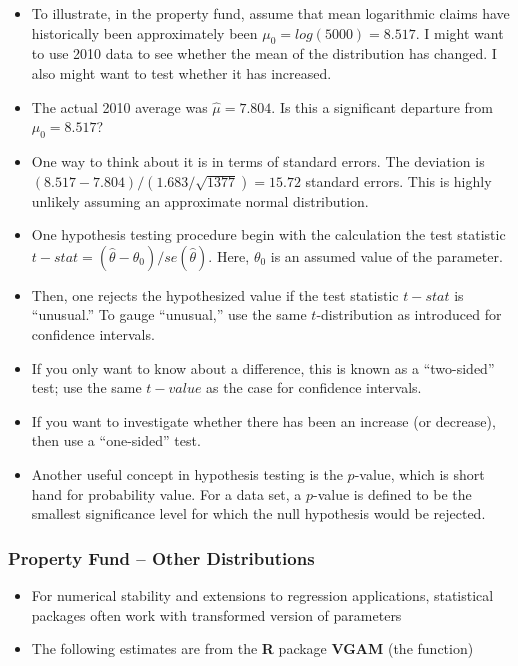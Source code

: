 \documentclass[]{book}
\theoremstyle{definition}
\theoremstyle{definition}
\theoremstyle{definition}
\theoremstyle{remark}
\begin{document}
\begin{itemize}
\item
  To illustrate, in the property fund, assume that mean logarithmic
  claims have historically been approximately been
  \(\mu_0 = log(5000)= 8.517\). I might want to use 2010 data to see
  whether the mean of the distribution has changed. I also might want to
  test whether it has increased.
\item
  The actual 2010 average was \(\hat{\mu} =7.804\). Is this a
  significant departure from \(\mu_0 = 8.517\)?
\item
  One way to think about it is in terms of standard errors. The
  deviation is \((8.517-7.804)/(1.683/\sqrt{1377}) = 15.72\) standard
  errors. This is highly unlikely assuming an approximate normal
  distribution.
\item
  One hypothesis testing procedure begin with the calculation the test
  statistic \(t-stat=(\hat{\theta}-\theta_0)/se(\hat{\theta})\). Here,
  \(\theta_0\) is an assumed value of the parameter.
\item
  Then, one rejects the hypothesized value if the test statistic
  \(t-stat\) is ``unusual.'' To gauge ``unusual,'' use the same
  \(t\)-distribution as introduced for confidence intervals.
\item
  If you only want to know about a difference, this is known as a
  ``two-sided'' test; use the same \(t-value\) as the case for
  confidence intervals.
\item
  If you want to investigate whether there has been an increase (or
  decrease), then use a ``one-sided'' test.
\item
  Another useful concept in hypothesis testing is the \(p\)-value, which
  is short hand for probability value. For a data set, a \(p\)-value is
  defined to be the smallest significance level for which the null
  hypothesis would be rejected.
\end{itemize}

\subsubsection{Property Fund -- Other
Distributions}\label{property-fund-other-distributions}

\begin{itemize}
\item
  For numerical stability and extensions to regression applications,
  statistical packages often work with transformed version of parameters
\item
  The following estimates are from the \textbf{R} package \textbf{VGAM}
  (the function)
\end{itemize}
\end{document}
